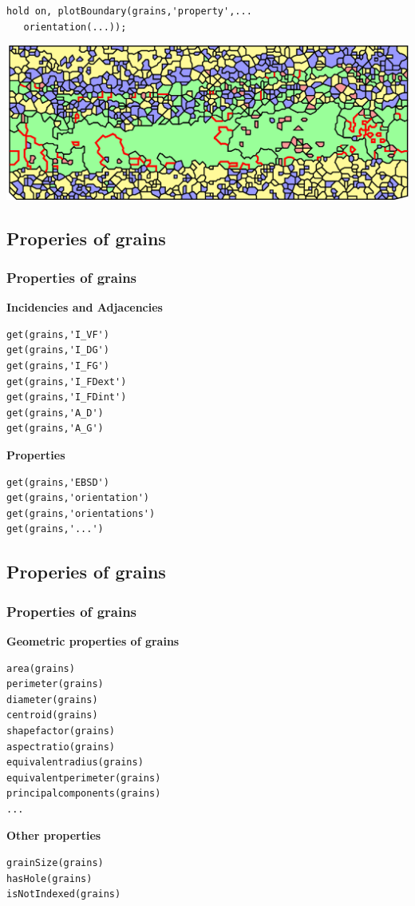 \begin{frame}[fragile]
\begin{overprint}
\begin{lstlisting}
hold on, plotBoundary(grains,'property',...
   orientation(...));
\end{lstlisting}


\begin{center}
\includegraphics[width=\linewidth]{fig/twinsc}
\par\end{center}

\end{overprint}

\end{frame}



\subsection{Properies of grains}
\begin{frame}[fragile]
  \frametitle{Properties of grains}

\textbf{Incidencies and Adjacencies}
\begin{lstlisting}
get(grains,'I_VF')
get(grains,'I_DG')
get(grains,'I_FG')
get(grains,'I_FDext')
get(grains,'I_FDint')
get(grains,'A_D')
get(grains,'A_G')
\end{lstlisting}

\textbf{Properties}
\begin{lstlisting}
get(grains,'EBSD')
get(grains,'orientation')
get(grains,'orientations')
get(grains,'...')
\end{lstlisting}

\end{frame}




\subsection{Properies of grains}
\begin{frame}[fragile]
  \frametitle{Properties of grains}

\textbf{Geometric properties of grains}
\begin{lstlisting}
area(grains)
perimeter(grains)
diameter(grains)
centroid(grains)
shapefactor(grains)
aspectratio(grains)
equivalentradius(grains)
equivalentperimeter(grains)
principalcomponents(grains)
...
\end{lstlisting}

\textbf{Other properties}
\begin{lstlisting}
grainSize(grains)
hasHole(grains)
isNotIndexed(grains)
\end{lstlisting}

\end{frame}



